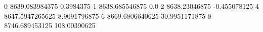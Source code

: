 0 8639.083984375 0.3984375
1 8638.685546875 0.0
2 8638.23046875 -0.455078125
4 8647.5947265625 8.9091796875
6 8669.6806640625 30.9951171875
8 8746.689453125 108.00390625
